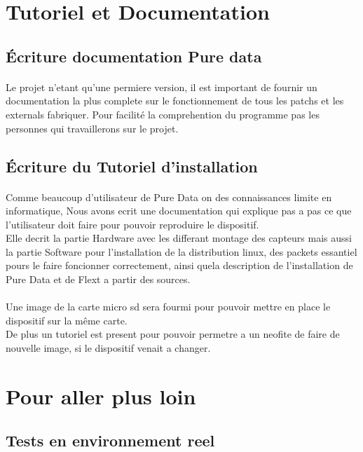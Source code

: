 \documentclass[a4paper, titlepage, oneside, 12pt]{article}%
\begin{document}
\section{Tutoriel et Documentation}
\subsection{Écriture documentation Pure data}
\paragraph{}
Le projet n'etant qu'une permiere version, il est important de fournir un documentation la plus complete sur le fonctionnement de tous les patchs et les externals fabriquer. Pour facilité la comprehention du programme pas les personnes qui travaillerons sur le projet.
\subsection{Écriture du Tutoriel d'installation}
\paragraph{}
Comme beaucoup d'utilisateur de Pure Data on des connaissances limite en informatique, Nous avons ecrit une documentation qui explique pas a pas ce que l'utilisateur doit faire pour pouvoir reproduire le dispositif.\\
Elle decrit la partie Hardware avec les differant montage des capteurs mais aussi la partie Software pour l'installation de la distribution linux, des packets essantiel pours le faire foncionner correctement, ainsi quela description de l'installation de Pure Data et de Flext a partir des sources.

\paragraph{}
Une image de la carte micro sd sera fourmi pour pouvoir mettre en place le dispositif sur la même carte.\\
De plus un tutoriel est present pour pouvoir permetre a un neofite de faire de nouvelle image, si le dispositif venait a changer.

\section{Pour aller plus loin}
\subsection{Tests en environnement reel}
\end{document}
